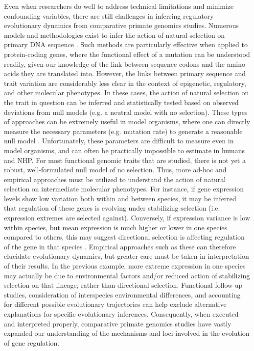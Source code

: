 Even when researchers do well to address technical limitations and minimize confounding variables, there are still challenges in inferring regulatory evolutionary dynamics from comparative primate genomics studies. Numerous models and methodologies exist to infer the action of natural selection on primary DNA sequence \cite{Vitti.2013}. Such methods are particularly effective when applied to protein-coding genes, where the functional effect of a mutation can be understood readily, given our knowledge of the link between sequence codons and the amino acids they are translated into. However, the links between primary sequence and trait variation are considerably less clear in the context of epigenetic, regulatory, and other molecular phenotypes. In these cases, the action of natural selection on the trait in question can be inferred and statistically tested based on observed deviations from null models (e.g. a neutral model with no selection). These types of approaches can be extremely useful in model organisms, where one can directly measure the necessary parameters (e.g. mutation rate) to generate a reasonable null model \cite{Gilad.2006ald}. Unfortunately, these parameters are difficult to measure even in model organisms, and can often be practically impossible to estimate in humans and NHP. For most functional genomic traits that are studied, there is not yet a robust, well-formulated null model of no selection. Thus, more ad-hoc and empirical approaches must be utilized to understand the action of natural selection on intermediate molecular phenotypes. For instance, if gene expression levels show low variation both within and between species, it may be inferred that regulation of these genes is evolving under stabilizing selection (i.e. expression extremes are selected against). Conversely, if expression variance is low within species, but mean expression is much higher or lower in one species compared to others, this may suggest directional selection is affecting regulation of the gene in that species \cite{Romero.2012}. Empirical approaches such as these can therefore elucidate evolutionary dynamics, but greater care must be taken in interpretation of their results. In the previous example, more extreme expression in one species may actually be due to environmental factors and/or reduced action of stabilizing selection on that lineage, rather than directional selection. Functional follow-up studies, consideration of interspecies environmental differences, and accounting for different possible evolutionary trajectories can help exclude alternative explanations for specific evolutionary inferences. Consequently, when executed and interpreted properly, comparative primate genomics studies have vastly expanded our understanding of the mechanisms and loci involved in the evolution of gene regulation.

